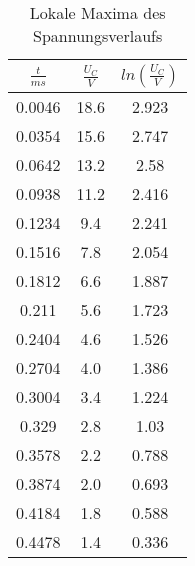 \documentclass[11pt,ngerman,a4paper]{article}
\begin{document}
\newpage
\begin{table}[H]
\centering
\begin{tabular}{|c|c|c|}
\hline
$\frac{t}{ms}$ & $\frac{U_C}{V}$ & $ln(\frac{U_C}{V})$ \\
\hline
0.0046 & 18.6 & 2.923\\
0.0354 & 15.6 & 2.747\\
0.0642 & 13.2 & 2.58\\
0.0938 & 11.2 & 2.416\\
0.1234 & 9.4 & 2.241\\
0.1516 & 7.8 & 2.054\\
0.1812 & 6.6 & 1.887\\
0.211 & 5.6 & 1.723\\
0.2404 & 4.6 & 1.526\\
0.2704 & 4.0 & 1.386\\
0.3004 & 3.4 & 1.224\\
0.329 & 2.8 & 1.03\\
0.3578 & 2.2 & 0.788\\
0.3874 & 2.0 & 0.693\\
0.4184 & 1.8 & 0.588\\
0.4478 & 1.4 & 0.336\\
\hline
\end{tabular}
\label{mtab1}
\caption{Lokale Maxima des Spannungsverlaufs}
\end{table}
\end{document}

